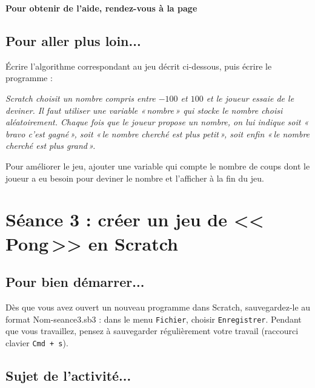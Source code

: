 \textbf{Pour obtenir de l'aide, rendez-vous à la page \pageref{aide_seanceScratch2}}




\subsection{Pour aller plus loin...}

Écrire l'algorithme correspondant au jeu décrit ci-dessous, puis écrire le programme :

\vspace{6pt}

\emph{Scratch choisit un nombre compris entre $-100$ et $100$ et le joueur essaie de le deviner. Il faut utiliser une variable «\,nombre\,» qui stocke le nombre choisi aléatoirement. Chaque fois que le joueur propose un nombre, on lui indique soit «\,bravo c'est gagné\,», soit «\,le nombre cherché est plus petit\,», soit enfin «\,le nombre cherché est plus grand\,».}

\vspace{6pt}

Pour améliorer le jeu, ajouter une variable qui compte le nombre de coups dont le joueur a eu besoin pour deviner le nombre et l'afficher à la fin du jeu.

\newpage

%
%
%
%




\section{Séance 3 : créer un jeu de <<\,Pong\,>> en Scratch}\label{ficheScratch5e3}


\subsection{Pour bien démarrer...}

Dès que vous avez ouvert un nouveau programme dans Scratch, sauvegardez-le au format Nom-seance3.sb3 : dans le menu \texttt{Fichier}, choisir \texttt{Enregistrer}. Pendant que vous travaillez, pensez à sauvegarder régulièrement votre travail (raccourci clavier \texttt{Cmd + s}).   


\subsection{Sujet de l'activité...}

